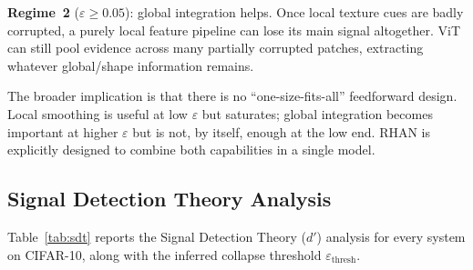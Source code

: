 \documentclass[12pt,a4paper]{article}
\begin{document}
\textbf{Regime~2} ($\varepsilon \geq 0.05$): global integration helps. Once local
texture cues are badly corrupted, a purely local feature pipeline can lose its
main signal altogether. ViT can still pool evidence across many partially
corrupted patches, extracting whatever global/shape information remains.

The broader implication is that there is no ``one-size-fits-all'' feedforward
design. Local smoothing is useful at low $\varepsilon$ but saturates; global
integration becomes important at higher $\varepsilon$ but is not, by itself,
enough at the low end. RHAN is explicitly designed to combine both capabilities
in a single model.

\subsection{Signal Detection Theory Analysis}

Table~\ref{tab:sdt} reports the Signal Detection Theory ($d'$) analysis for every
system on CIFAR-10, along with the inferred collapse threshold
$\varepsilon_{\text{thresh}}$.
\end{document}
